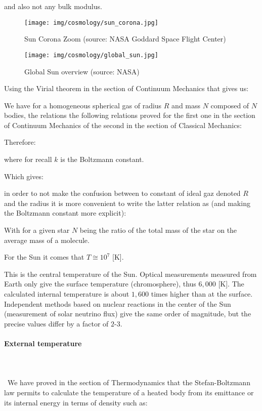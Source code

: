 	and also not any bulk modulus.
	\begin{figure}[H]
		\begin{center}
		\texttt{[image: img/cosmology/sun\_corona.jpg]}
		\end{center}	
		\caption[Sun Corona Zoom]{Sun Corona Zoom (source: NASA Goddard Space Flight Center)}
	\end{figure}
	\begin{figure}[H]
		\begin{center}
		\texttt{[image: img/cosmology/global\_sun.jpg]}
		\end{center}	
		\caption[Global Sun overview]{Global Sun overview (source: NASA)}
	\end{figure}
		
	Using the Virial theorem in the section of Continuum Mechanics that gives us:
	
	We have for a homogeneous spherical gas of radius $R$ and mass $N$ composed of $N$ bodies, the relations the following relations proved for the first one in the section of Continuum Mechanics of the second in the section of Classical Mechanics:
	
	Therefore:
	
	where for recall $k$ is the Boltzmann constant.

	Which gives:
	
	in order to not make the confusion between to constant of ideal gaz denoted $R$ and the radius it is more convenient to write the latter relation as (and making the Boltzmann constant more explicit):
	
	With for a given star $N$ being the ratio of the total mass of the star on the average mass of a molecule.
	
	For the Sun it comes that $T\cong 10^7$ [K].
	
	This is the central temperature of the Sun. Optical measurements measured from Earth only give the surface temperature (chromosphere), thus $6,000$ [K]. The calculated internal temperature is about $1,600$ times higher than at the surface. Independent methods based on nuclear reactions in the center of the Sun (measurement of solar neutrino flux) give the same order of magnitude, but the precise values differ by a factor of $2$-$3$.
	
	\paragraph{External temperature}\mbox{}\\\\\
	We have proved in the section of Thermodynamics that the Stefan-Boltzmann law permits to calculate the temperature of a heated body from its emittance or its internal energy in terms of density such as:
	
